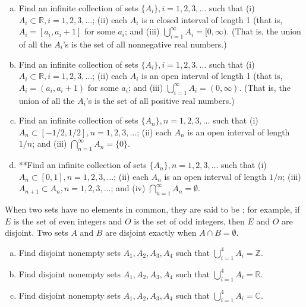 \begin{exercise}{15}
\begin{enumerate}[(a)]
\item
Find an infinite collection of sets $\{A_i\}, i = 1,2,3,\ldots$ such that (i) $A_i \subset {\mathbb R}, i = 1,2,3, \dots$; (ii)
 each $A_i$ is a closed  interval of length 1 (that is, $A_i = [a_i, a_i+1]$ for some $a_i$; and (iii) $\bigcup_{i = 1}^{\infty} A_{i} = [0, \infty)$. (That is, the union of all the $A_i$'s is the set of all nonnegative real numbers.)
\item
Find an infinite collection of sets $\{A_i\}, i = 1,2,3,\ldots$ such that (i) $A_i \subset {\mathbb R}, i = 1,2,3, \dots$; (ii)
 each $A_i$ is an open  interval of length 1 (that is, $A_i = (a_i, a_i+1)$ for some $a_i$; and (iii) $\bigcup_{i = 1}^{\infty} A_{i} = (0, \infty)$. (That is, the union of all the $A_i$'s is the set of all positive real numbers.)
\item
Find an infinite collection of sets $\{A_n\}, n = 1,2,3,\ldots$ such that (i) $A_n \subset  [-1/2,1/2], n = 1,2,3, \dots$; (ii)
 each $A_n$ is an open interval of length $1/n$; and (iii) $\bigcap_{n = 1}^{\infty} A_{n} = \{0\}$.
 \item
**Find an infinite collection of sets $\{A_n\}, n = 1,2,3,\ldots$ such that (i) $A_n \subset [0,1], n = 1,2,3, \dots$; (ii)
 each $A_n$ is an open interval of length $1/n$; (iii) $A_{n+1} \subset A_{n}, n = 1,2,3, \dots$; and (iv) $\bigcap_{n = 1}^{\infty} A_{n} = \emptyset$.
\end{enumerate}
\end{exercise}

When two sets have no elements in common, they are said to be ; for example, if $E$ is the set of even integers and $O$ is the set of odd integers, then $E$ and $O$ are disjoint.  Two sets $A$ and $B$ are disjoint exactly when $A \cap B = \emptyset$. 

\begin{exercise}{16}
\begin{enumerate}[(a)]
\item
Find disjoint nonempty sets $A_1, A_2, A_3, A_4$ such that $\bigcup_{i = 1}^{4} A_i = {\mathbb Z}$.
\item
Find  disjoint nonempty sets $A_1, A_2, A_3, A_4$ such that $\bigcup_{i = 1}^{4} A_i = {\mathbb R}$.
\item
Find  disjoint nonempty sets $A_1, A_2, A_3, A_4$ such that $\bigcup_{i = 1}^{4} A_i = {\mathbb C}$.
\end{enumerate}
\end{exercise} 


